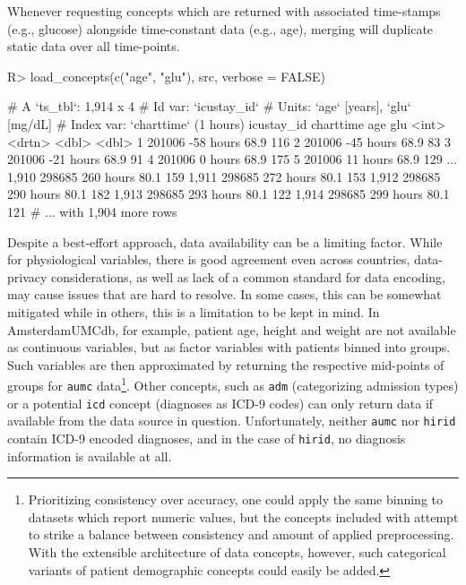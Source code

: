 \documentclass[
  notitle,
  nojss,
  noheadings]{jss}
\begin{document}
Whenever requesting concepts which are returned with associated
time-stamps (e.g., glucose) alongside time-constant data (e.g., age),
merging will duplicate static data over all time-points.

\begin{CodeChunk}
\begin{CodeInput}
R> load_concepts(c("age", "glu"), src, verbose = FALSE)
\end{CodeInput}
\begin{CodeOutput}
# A `ts_tbl`: 1,914 x 4
# Id var:     `icustay_id`
# Units:      `age` [years], `glu` [mg/dL]
# Index var:  `charttime` (1 hours)
      icustay_id charttime   age   glu
           <int> <drtn>    <dbl> <dbl>
    1     201006 -58 hours  68.9   116
    2     201006 -45 hours  68.9    83
    3     201006 -21 hours  68.9    91
    4     201006   0 hours  68.9   175
    5     201006  11 hours  68.9   129
  ...
1,910     298685 260 hours  80.1   159
1,911     298685 272 hours  80.1   153
1,912     298685 290 hours  80.1   182
1,913     298685 293 hours  80.1   122
1,914     298685 299 hours  80.1   121
# ... with 1,904 more rows
\end{CodeOutput}
\end{CodeChunk}

Despite a best-effort approach, data availability can be a limiting
factor. While for physiological variables, there is good agreement even
across countries, data-privacy considerations, as well as lack of a
common standard for data encoding, may cause issues that are hard to
resolve. In some cases, this can be somewhat mitigated while in others,
this is a limitation to be kept in mind. In AmsterdamUMCdb, for example,
patient age, height and weight are not available as continuous
variables, but as factor variables with patients binned into groups.
Such variables are then approximated by returning the respective
mid-points of groups for \texttt{aumc} data\footnote{Prioritizing
  consistency over accuracy, one could apply the same binning to
  datasets which report numeric values, but the concepts included with
   attempt to strike a balance between consistency and amount
  of applied preprocessing. With the extensible architecture of data
  concepts, however, such categorical variants of patient demographic
  concepts could easily be added.}. Other concepts, such as \texttt{adm}
(categorizing admission types) or a potential \texttt{icd} concept
(diagnoses as ICD-9 codes) can only return data if available from the
data source in question. Unfortunately, neither \texttt{aumc} nor
\texttt{hirid} contain ICD-9 encoded diagnoses, and in the case of
\texttt{hirid}, no diagnosis information is available at all.
\end{document}
